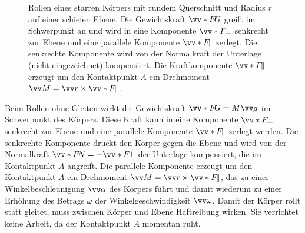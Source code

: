 \begin{figure}[ht]
    \caption{Rollen eines starren Körpers mit rundem Querschnitt und Radius $r$ auf einer schiefen Ebene. Die Gewichtskraft $\protect\ivecS{F}{G}$ greift im Schwerpunkt an und wird in eine Komponente $\protect\ivecS{F}{\perp}$ senkrecht zur Ebene und eine parallele Komponente $\protect\ivecS{F}{\parallel}$ zerlegt. Die senkrechte Komponente wird von der Normalkraft der Unterlage (nicht eingezeichnet) kompensiert. Die Kraftkomponente $\protect\ivecS{F}{\parallel}$ erzeugt um den Kontaktpunkt $A$ ein Drehmoment $\protect\ivec{M} = \protect\ivec{r} \times \protect\ivecS{F}{\parallel}$.}\label{fig: rollen_schiefe_ebene}
\end{figure}

Beim Rollen ohne Gleiten wirkt die Gewichtskraft $\ivecS{F}{G} = M \ivec{g}$ im Schwerpunkt des Körpers. Diese Kraft kann in eine Komponente $\ivecS{F}{\perp}$ senkrecht zur Ebene und eine parallele Komponente $\ivecS{F}{\parallel}$ zerlegt werden. Die senkrechte Komponente drückt den Körper gegen die Ebene und wird von der Normalkraft $\ivecS{F}{N} = -\ivecS{F}{\perp}$ der Unterlage kompensiert, die im Kontaktpunkt $A$ angreift. Die parallele Komponente erzeugt um den Kontaktpunkt $A$ ein Drehmoment $\ivec{M} = \ivec{r} \times \ivecS{F}{\parallel}$, das zu einer Winkelbeschleunigung $\ivec{\alpha}$ des Körpers führt und damit wiederum zu einer Erhöhung des Betrags $\omega$ der Winkelgeschwindigkeit $\ivec{\omega}$. Damit der Körper rollt statt gleitet, muss zwischen Körper und Ebene Haftreibung wirken. Sie verrichtet keine Arbeit, da der Kontaktpunkt $A$ momentan ruht.

